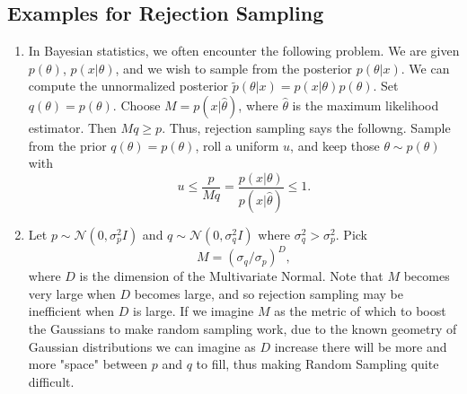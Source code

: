 \documentclass{article}
\begin{document}
\subsection{Examples for Rejection Sampling}

\begin{enumerate}
    \item In Bayesian statistics, we often encounter the following problem. We are given $p(\theta)$, $p(x|\theta)$, and we wish to sample from the posterior $p(\theta|x)$. We can compute the unnormalized posterior $\tilde p(\theta|x) = p(x|\theta) p(\theta)$. Set $q(\theta) = p(\theta)$. Choose $M = p(x|\hat \theta)$, where $\hat \theta$ is the maximum likelihood estimator. Then $Mq \ge p$. Thus, rejection sampling says the followng. Sample from the prior $q(\theta) = p(\theta)$, roll a uniform $u$, and keep those $\theta \sim p(\theta)$ with \[u \le \frac{p}{Mq} = \frac{p(x|\theta)}{p(x|\hat \theta)} \le 1.\]
    \item Let $p \sim \mathcal N(0,\sigma_p^2 I)$ and $q \sim \mathcal N(0,\sigma_q^2I)$ where $\sigma_q^2 > \sigma_p^2$. Pick \[
    M = ({\sigma_q/\sigma_p})^D,
    \] 
    where $D$ is the dimension of the Multivariate Normal. Note that $M$ becomes very large when $D$ becomes large, and so rejection sampling may be inefficient when $D$ is large. If we imagine $M$ as the metric of which to boost the Gaussians to make random sampling work, due to the known geometry of Gaussian distributions we can imagine as $D$ increase there will be more and more "space" between $p$ and $q$ to fill, thus making Random Sampling quite difficult. 
\end{enumerate}

    
\end{document}
